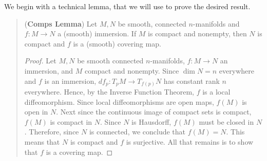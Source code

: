 \documentclass{article}
\begin{document}
\begin{solutions}
	We begin with a technical lemma, that we will use to prove the desired result. 
		\begin{quote}
			(\textbf{Comps Lemma}) Let $M, N$ be smooth, connected $n$-manifolds and $f: M \to N$ a (smooth) immersion. If $M$ is compact and nonempty, then $N$ is compact and $f$ is a (smooth) covering map. 
			
			\begin{proof}
				Let $M, N$ be smooth connected $n$-manifolds, $f: M \to N$ an immersion, and $M$ compact and nonempty. Since $\dim{N} = n$ everywhere and $f$ is an immersion, $df_{p}: T_{p}M \to T_{f(p)}N$ has constant rank $n$ everywhere. Hence, by the Inverse Function Theorem, $f$ is a local diffeomorphism. Since local diffeomorphisms are open maps, $f(M)$ is open in $N$. Next since the continuous image of compact sets is compact, $f(M)$ is compact in $N$. Since $N$ is Hausdorff, $f(M)$ must be closed in $N$. Therefore, since $N$ is connected, we conclude that $f(M) = N$. This means that $N$ is compact and $f$ is surjective. All that remains is to show that $f$ is a covering map. 
				

\end{proof}
\end{quote}
\end{solutions}
\end{document}
